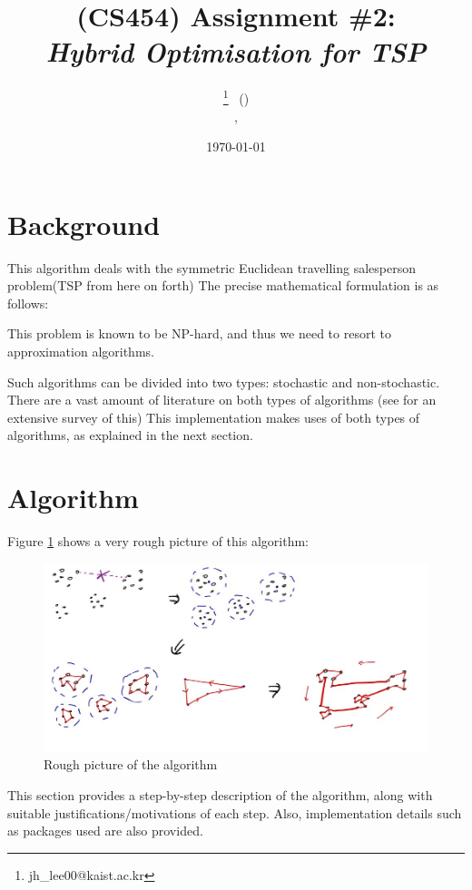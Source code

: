 \documentclass[a4paper]{article}
\title{(CS454) Assignment \#2: \\
	{\it Hybrid Optimisation for TSP} \bigskip}
\author{\textbf{\Large \name}\thanks{jh\_lee00@kaist.ac.kr} \ (\studentid) \\
\department, \university}
\date{\today}
\makeatletter
\newcommand{\problemtitle}[1]{\gdef\@problemtitle{#1}}%
\newcommand{\probleminput}[1]{\gdef\@probleminput{#1}}%
\newcommand{\problemquestion}[1]{\gdef\@problemquestion{#1}}%
\makeatother
\begin{document}
\thispagestyle{empty}
\maketitle
\tableofcontents
\newpage




\section{Background}
This algorithm deals with the symmetric Euclidean travelling salesperson problem(TSP from here on forth)
The precise mathematical formulation is as follows:
\begin{problem}
	\probleminput{A set of $N$ coordinates $\{(x_i, y_i)\}_{i=0}^{N-1}$.}
	\problemquestion{Find the Hamiltonian cycle of $K_N$ with the least weight, where $K_N$ is a undirected complete graph on vertices $\{(x_i, y_i)\}_{i=0}^{N-1}$ whose edge weight is the usual Euclidean distance.}
\end{problem}

This problem is known to be NP-hard, and thus we need to resort to approximation algorithms.

Such algorithms can be divided into two types: stochastic and non-stochastic.
There are a vast amount of literature on both types of algorithms (see \cite{La92, Ma09, ABCC07} for an extensive survey of this)
This implementation makes uses of both types of algorithms, as explained in the next section.


\section{Algorithm}
Figure \ref{fig1} shows a very rough picture of this algorithm:
\begin{figure}
\label{fig1}
	\includegraphics[width=\textwidth]{Figures/fig1.jpg}
	\caption{Rough picture of the algorithm}
\end{figure}
This section provides a step-by-step description of the algorithm, along with suitable justifications/motivations of each step.
Also, implementation details such as packages used are also provided.
\end{document}
